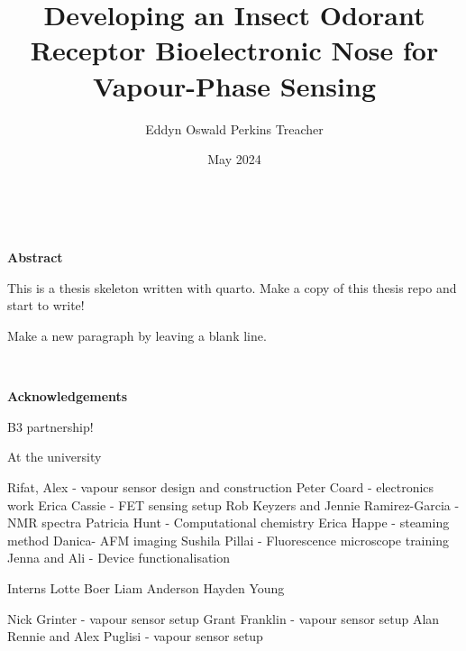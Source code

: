 \documentclass[
  a4paper,
]{scrbook}
\title{Developing an Insect Odorant Receptor Bioelectronic Nose for
Vapour-Phase Sensing}
\author{Eddyn Oswald Perkins Treacher}
\date{May 2024}
\begin{document}
\frontmatter

\maketitle

\clearpage
\newpage
\thispagestyle{empty} %
\mbox{~}
\clearpage
\newpage


\begin{flushleft}
\huge\textbf{Abstract}
\end{flushleft}

\vspace*{\baselineskip}

This is a thesis skeleton written with quarto.
Make a copy of this thesis repo and start to write!

Make a new paragraph by leaving a blank line.

\clearpage
\newpage
\thispagestyle{empty} %
\mbox{~}
\clearpage
\newpage



\begin{flushleft}
\huge\textbf{Acknowledgements}
\end{flushleft}

\vspace*{\baselineskip}

B3 partnership!

At the university

Rifat, Alex - vapour sensor design and construction
Peter Coard - electronics work
Erica Cassie - FET sensing setup
Rob Keyzers and Jennie Ramirez-Garcia - NMR spectra
Patricia Hunt - Computational chemistry
Erica Happe - steaming method
Danica- AFM imaging
Sushila Pillai - Fluorescence microscope training
Jenna and Ali - Device functionalisation

Interns
Lotte Boer
Liam Anderson
Hayden Young

Nick Grinter - vapour sensor setup
Grant Franklin - vapour sensor setup
Alan Rennie and Alex Puglisi - vapour sensor setup
\end{document}
